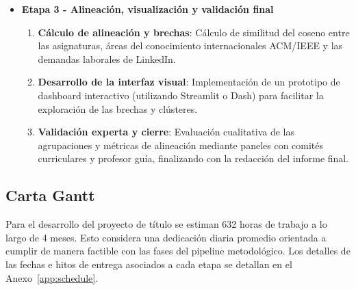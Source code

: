\begin{itemize}
    \item \textbf{Etapa 3 - Alineación, visualización y validación final}
        \begin{enumerate}
            \item \textbf{Cálculo de alineación y brechas}: Cálculo de similitud del coseno entre las asignaturas, áreas del conocimiento internacionales ACM/IEEE y las demandas laborales de LinkedIn.
            \item \textbf{Desarrollo de la interfaz visual}: Implementación de un prototipo de dashboard interactivo (utilizando Streamlit o Dash) para facilitar la exploración de las brechas y clústeres.
            \item \textbf{Validación experta y cierre}: Evaluación cualitativa de las agrupaciones y métricas de alineación mediante paneles con comités curriculares y profesor guía, finalizando con la redacción del informe final.
        \end{enumerate}
\end{itemize}

\subsection{Carta Gantt}
\label{sec:ganttChart}

Para el desarrollo del proyecto de título se estiman 632 horas de trabajo a lo largo de 4 meses. Esto considera una dedicación diaria promedio orientada a cumplir de manera factible con las fases del pipeline metodológico. Los detalles de las fechas e hitos de entrega asociados a cada etapa se detallan en el Anexo~\ref{app:schedule}.
